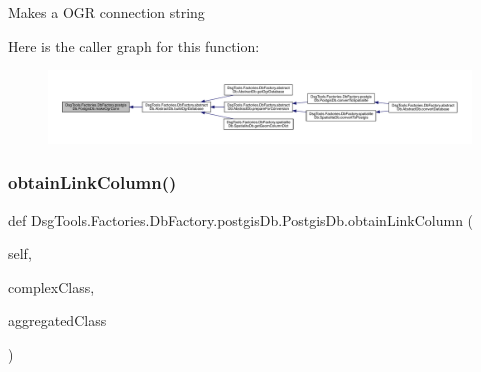 \begin{DoxyVerb}Makes a OGR connection string
\end{DoxyVerb}
 Here is the caller graph for this function\+:
\nopagebreak
\begin{figure}[H]
\begin{center}
\leavevmode
\includegraphics[width=350pt]{class_dsg_tools_1_1_factories_1_1_db_factory_1_1postgis_db_1_1_postgis_db_a41684c4b7f79ba2b21e4bea0c18d7804_icgraph}
\end{center}
\end{figure}
\mbox{\label{class_dsg_tools_1_1_factories_1_1_db_factory_1_1postgis_db_1_1_postgis_db_af56a40cf1c4ffa7d251cf7bba5618af5}} 
\subsubsection{\texorpdfstring{obtain\+Link\+Column()}{obtainLinkColumn()}}
{\footnotesize\ttfamily def Dsg\+Tools.\+Factories.\+Db\+Factory.\+postgis\+Db.\+Postgis\+Db.\+obtain\+Link\+Column (\begin{DoxyParamCaption}\item[{}]{self,  }\item[{}]{complex\+Class,  }\item[{}]{aggregated\+Class }\end{DoxyParamCaption})}

